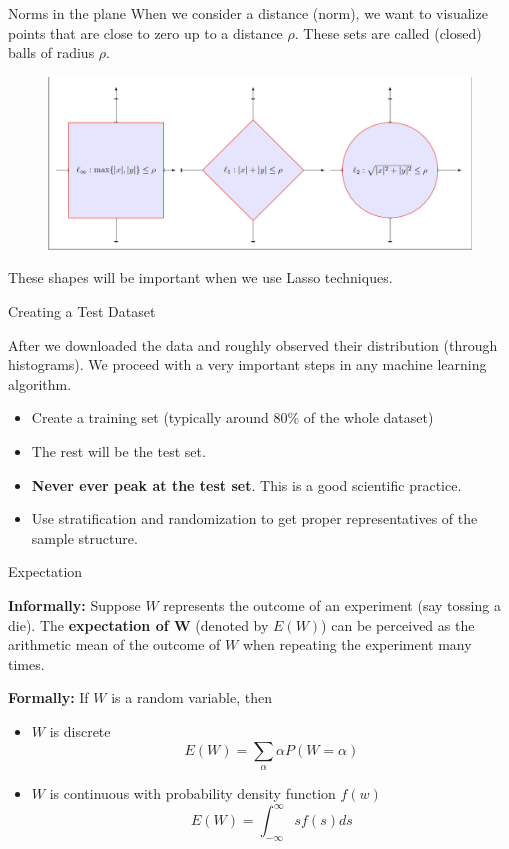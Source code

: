 \documentclass{beamer}
\begin{document}
\begin{frame}{Norms in the plane }
	When we consider a distance (norm), we want to visualize points that are close to zero up to a distance $\rho$. These sets are called (closed) balls of radius $\rho$. 
\begin{figure}
	\centering
	\includegraphics[scale=0.35]{../../Figures/fig_lp_metrics.png}
\end{figure}
These shapes will be important when we use Lasso techniques.

\end{frame}

\begin{frame}{Creating a Test Dataset}
	
	After we downloaded the data and roughly observed their distribution (through histograms). We proceed with a very important steps in any machine learning algorithm.
	
	\begin{itemize}
		\item Create a training set (typically around 80\% of the whole dataset)
		\item The rest will be the test set.
		\item {\bf Never ever peak at the test set}. This is a good scientific practice. 
		\item Use stratification and randomization to get proper representatives of the sample structure.
	\end{itemize} 
\end{frame}

\begin{frame}{Expectation}
	
	{\bf Informally: }
	Suppose $W$ represents the outcome of an experiment (say tossing a die). The {\bf expectation of W} (denoted by $E(W)$) can be perceived as the arithmetic mean of the outcome of $W$ when repeating the experiment many times. 
	
	{\bf Formally: }
	If $W$ is a random variable, then
	\begin{itemize}
		\item $W$ is discrete
		\begin{equation*}
			E(W)= \sum_{\alpha} \alpha P(W=\alpha)
		\end{equation*}
	\item $W$ is continuous with probability density function $f(w)$
	\begin{equation*}
		E(W)= \int_{-\infty}^\infty s f(s) ds
	\end{equation*}
	\end{itemize}
\end{frame}
\end{document}
